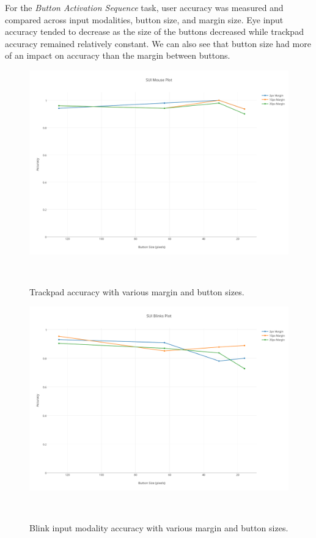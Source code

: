 \documentclass{sigchi}
\begin{document}
For the \emph{Button Activation Sequence} task, user accuracy was measured and compared across input modalities, button size, and margin size. Eye input accuracy tended to decrease as the size of the buttons decreased while trackpad accuracy remained relatively constant. We can also see that button size had more of an impact on accuracy than the margin between buttons.

\begin{figure}
\centering
  \includegraphics[width=0.9\columnwidth]{figures/mouse-accuracy.pdf}
  \caption{Trackpad accuracy with various margin and button sizes.
  }~\label{fig:mouse-accuracy}
\end{figure}

\begin{figure}
\centering
  \includegraphics[width=0.9\columnwidth]{figures/blink-accuracy.pdf}
  \caption{Blink input modality accuracy with various margin and button sizes.
  }~\label{fig:blink-accuracy}
\end{figure}
\end{document}
